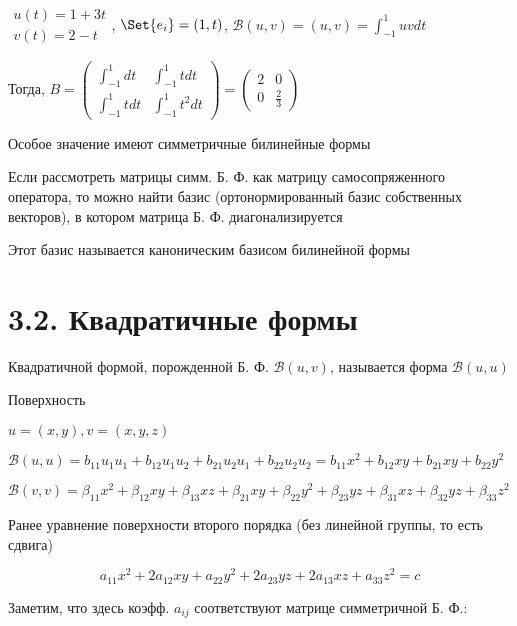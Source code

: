 \documentclass[12pt]{article}
\begin{document}
    \Ex $\begin{matrix}u(t) = 1 + 3t \\ v(t) = 2 - t\end{matrix}$, $\Set{e_i} = (1, t)$, $\mathcal{B}(u, v) = (u, v) = \int_{-1}^1 uv dt$

    Тогда, $B = \begin{pmatrix}\int_{-1}^1 dt & \int_{-1}^1 t dt \\ \int_{-1}^1 t dt & \int_{-1}^1 t^2 dt\end{pmatrix} = \begin{pmatrix}2 & 0 \\ 0 & \frac{2}{3}\end{pmatrix}$


    \Nota Особое значение имеют симметричные билинейные формы

    Если рассмотреть матрицы симм. Б. Ф. как матрицу самосопряженного оператора, то можно найти базис
    (ортонормированный базис собственных векторов), в котором матрица Б. Ф. диагонализируется

    Этот базис называется каноническим базисом билинейной формы

    \section{3.2. Квадратичные формы}

    \hypertarget{quadraticform}{}

    \Def Квадратичной формой, порожденной Б. Ф. $\mathcal{B}(u, v)$, называется форма $\mathcal{B}(u, u)$

    \Ex Поверхность

    $u = (x, y), v = (x, y, z)$

    $\mathcal{B}(u, u) = b_{11}u_1 u_1 + b_{12} u_1 u_2 + b_{21} u_2 u_1 + b_{22} u_2 u_2 = b_{11} x^2 + b_{12}xy + b_{21}xy + b_{22}y^2$

    $\mathcal{B}(v, v) = \beta_{11} x^2 + \beta_{12}xy + \beta_{13}xz + \beta_{21} xy + \beta_{22}y^2 + \beta_{23}yz + \beta_{31} xz + \beta_{32}yz + \beta_{33}z^2$

    \Mem Ранее уравнение поверхности второго порядка (без линейной группы, то есть сдвига)

    \[a_{11}x^2 + 2a_{12}xy + a_{22}y^2 + 2a_{23}yz + 2a_{13}xz + a_{33}z^2 = c\]

    \Nota Заметим, что здесь коэфф. $a_{ij}$ соответствуют матрице симметричной Б. Ф.:
\end{document}
